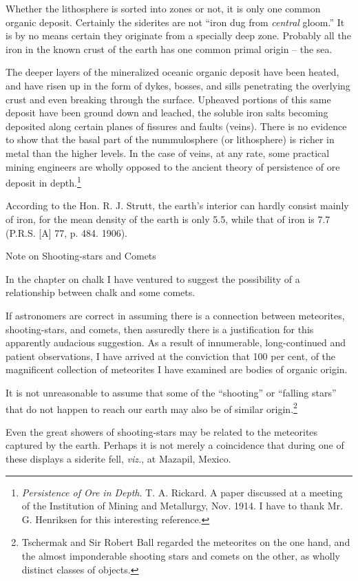 \documentclass[a4paper, 12pt, oneside]{article}
\begin{document}
Whether the lithosphere is sorted into zones or not, it is only one common organic deposit. Certainly the siderites are not ``iron dug from \emph{central} gloom.'' It is by no means certain they originate from a specially deep zone. Probably all the iron in the known crust of the earth has one common primal origin -- the sea.

The deeper layers of the mineralized oceanic organic deposit have been heated, and have risen up in the form of dykes, bosses, and sills penetrating the overlying crust and even breaking through the surface. Upheaved portions of this same deposit have been ground down and leached, the soluble iron salts becoming deposited along certain planes of fissures and faults (veins). There is no evidence to show that the basal part of the nummulosphere (or lithosphere) is richer in metal than the higher levels. In the case of veins, at any rate, some practical mining engineers are wholly opposed to the ancient theory of persistence of ore deposit in depth.\footnote{\emph{Persistence of Ore in Depth}. T. A. Rickard. A paper discussed at a meeting of the Institution of Mining and Metallurgy, Nov. 1914. I have to thank Mr. G. Henriksen for this interesting reference.}

According to the Hon. R. J. Strutt, the earth's interior can hardly consist mainly of iron, for the mean density of the earth is only 5.5, while that of iron is 7.7 (P.R.S. [A] 77, p. 484. 1906).

Note on Shooting-stars and Comets

In the chapter on chalk I have ventured to suggest the possibility of a relationship between chalk and some comets.

If astronomers are correct in assuming there is a connection between meteorites, shooting-stars, and comets, then assuredly there is a justification for this apparently audacious suggestion. As a result of innumerable, long-continued and patient observations, I have arrived at the conviction that 100 per cent, of the magnificent collection of meteorites I have examined are bodies of organic origin.

It is not unreasonable to assume that some of the ``shooting'' or ``falling stars'' that do not happen to reach our earth may also be of similar origin.\footnote{Tschermak and Sir Robert Ball regarded the meteorites on the one hand, and the almost imponderable shooting stars and comets on the other, as wholly distinct classes of objects.}

Even the great showers of shooting-stars may be related to the meteorites captured by the earth. Perhaps it is not merely a coincidence that during one of these displays a siderite fell, \emph{viz.}, at Mazapil, Mexico.
\end{document}
